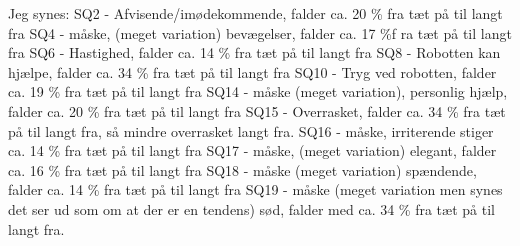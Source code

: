Jeg synes:
SQ2 - Afvisende/imødekommende, falder ca. 20 \% fra tæt på til langt fra
SQ4 - måske, (meget variation) bevægelser, falder ca. 17 \%f ra tæt på til langt fra
SQ6 - Hastighed, falder ca. 14 \% fra tæt på til langt fra
SQ8 - Robotten kan hjælpe, falder ca. 34 \% fra tæt på til langt fra
SQ10 - Tryg ved robotten, falder ca. 19 \% fra tæt på til langt fra
SQ14 - måske (meget variation), personlig hjælp, falder ca. 20 \% fra tæt på til langt fra
SQ15 - Overrasket, falder ca. 34 \% fra tæt på til langt fra, så mindre overrasket langt fra. 
SQ16 - måske, irriterende stiger ca. 14 \% fra tæt på til langt fra
SQ17 - måske, (meget variation) elegant, falder ca. 16 \% fra tæt på til langt fra
SQ18 - måske (meget variation) spændende, falder ca. 14 \% fra tæt på til langt fra
SQ19 - måske (meget variation men synes det ser ud som om at der er en tendens) sød, falder med ca. 34 \% fra tæt på til langt fra.
